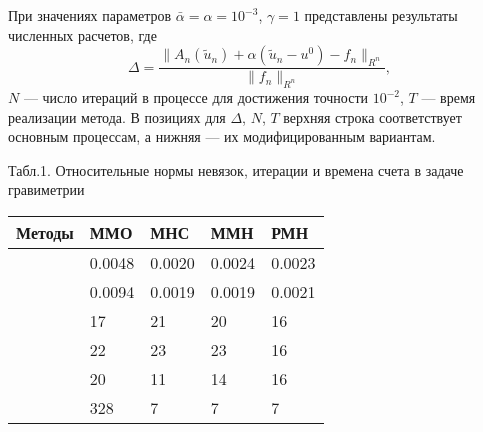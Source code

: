 \documentclass[10pt,pdf, mathserif, hyperref={unicode}]{beamer}
\begin{document}
\begin{frame}
	При значениях параметров $\bar\alpha=\alpha=10^{-3}$, $\gamma=1$ представлены результаты численных расчетов, где
	$$\Delta=\frac{\|A_n(\tilde{u}_n)+\alpha(\tilde{u}_n-u^0)-f_n\|_{R^n}}{\|f_n\|_{R^n}},$$
	$N$ --- число итераций в процессе для достижения точности $10^{-2}$, $T$ --- время реализации метода. В позициях для $\Delta$, $N$, $T$ верхняя строка соответствует основным процессам, а нижняя --- их модифицированным вариантам.
	\begin{table}
		\centering
		{\scriptsize Табл.1. Относительные нормы невязок, итерации и времена счета в задаче гравиметрии}
		\begin{tabular}{|p{}|p{}|p{}|p{}|p{}|}
			\hline
			\rule{0cm}{0.5cm}
			Методы & ММО & МНС & ММН & РМН \\ \hline
			\rule{0cm}{0.5cm}
			\multirow{$\Delta$} & 0.0048 & 0.0020 & 0.0024 & 0.0023	 \\ \cline{2-5} 
			\rule{0cm}{0.5cm}
			&  0.0094   & 0.0019    &  0.0019   &  0.0021   \\ \hline
			\rule{0cm}{0.5cm}
			\multirow{$N$} & 17  &  21   &   20  &  16    \\ \cline{2-5}
			\rule{0cm}{0.5cm}
			&  22   &   23  &  23   &  16   \\ \hline
			\rule{0cm}{0.5cm}
			\multirow{$T$ (сек)}    &  20   &  11   &  14  & 16    \\ \cline{2-5}
			\rule{0cm}{0.5cm}
			& 328    & 7    &  7   &   7  \\ \hline
		\end{tabular}
	\end{table}
\end{frame}
\end{document}
